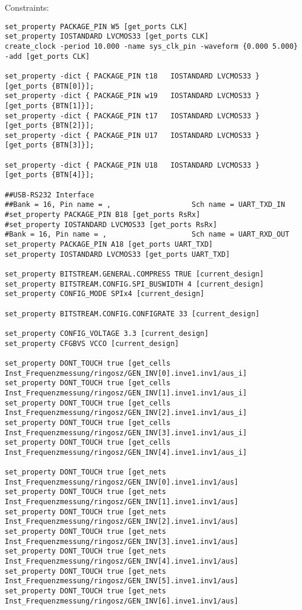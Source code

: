 \documentclass{article}
\begin{document}
Constraints:\newline
\begin{verbatim}
set_property PACKAGE_PIN W5 [get_ports CLK]
set_property IOSTANDARD LVCMOS33 [get_ports CLK]
create_clock -period 10.000 -name sys_clk_pin -waveform {0.000 5.000} -add [get_ports CLK]

set_property -dict { PACKAGE_PIN t18   IOSTANDARD LVCMOS33 } [get_ports {BTN[0]}];
set_property -dict { PACKAGE_PIN w19   IOSTANDARD LVCMOS33 } [get_ports {BTN[1]}];
set_property -dict { PACKAGE_PIN t17   IOSTANDARD LVCMOS33 } [get_ports {BTN[2]}];
set_property -dict { PACKAGE_PIN U17   IOSTANDARD LVCMOS33 } [get_ports {BTN[3]}];
                                                                                    
set_property -dict { PACKAGE_PIN U18   IOSTANDARD LVCMOS33 } [get_ports {BTN[4]}];

##USB-RS232 Interface
##Bank = 16, Pin name = ,					Sch name = UART_TXD_IN
#set_property PACKAGE_PIN B18 [get_ports RsRx]
#set_property IOSTANDARD LVCMOS33 [get_ports RsRx]
#Bank = 16, Pin name = ,					Sch name = UART_RXD_OUT
set_property PACKAGE_PIN A18 [get_ports UART_TXD]
set_property IOSTANDARD LVCMOS33 [get_ports UART_TXD]

set_property BITSTREAM.GENERAL.COMPRESS TRUE [current_design]
set_property BITSTREAM.CONFIG.SPI_BUSWIDTH 4 [current_design]
set_property CONFIG_MODE SPIx4 [current_design]

set_property BITSTREAM.CONFIG.CONFIGRATE 33 [current_design]

set_property CONFIG_VOLTAGE 3.3 [current_design]
set_property CFGBVS VCCO [current_design]

set_property DONT_TOUCH true [get_cells Inst_Frequenzmessung/ringosz/GEN_INV[0].inve1.inv1/aus_i]
set_property DONT_TOUCH true [get_cells Inst_Frequenzmessung/ringosz/GEN_INV[1].inve1.inv1/aus_i]
set_property DONT_TOUCH true [get_cells Inst_Frequenzmessung/ringosz/GEN_INV[2].inve1.inv1/aus_i]
set_property DONT_TOUCH true [get_cells Inst_Frequenzmessung/ringosz/GEN_INV[3].inve1.inv1/aus_i]
set_property DONT_TOUCH true [get_cells Inst_Frequenzmessung/ringosz/GEN_INV[4].inve1.inv1/aus_i]

set_property DONT_TOUCH true [get_nets Inst_Frequenzmessung/ringosz/GEN_INV[0].inve1.inv1/aus]
set_property DONT_TOUCH true [get_nets Inst_Frequenzmessung/ringosz/GEN_INV[1].inve1.inv1/aus]
set_property DONT_TOUCH true [get_nets Inst_Frequenzmessung/ringosz/GEN_INV[2].inve1.inv1/aus]
set_property DONT_TOUCH true [get_nets Inst_Frequenzmessung/ringosz/GEN_INV[3].inve1.inv1/aus]
set_property DONT_TOUCH true [get_nets Inst_Frequenzmessung/ringosz/GEN_INV[4].inve1.inv1/aus]
set_property DONT_TOUCH true [get_nets Inst_Frequenzmessung/ringosz/GEN_INV[5].inve1.inv1/aus]
set_property DONT_TOUCH true [get_nets Inst_Frequenzmessung/ringosz/GEN_INV[6].inve1.inv1/aus]


\end{verbatim}
\end{document}
